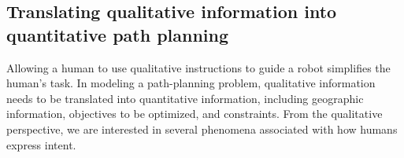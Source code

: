 \documentclass[phd]{byuprop}
\begin{document}
\subsection{Translating qualitative information into quantitative path planning}
\label{sec:intro:modeling_qualitative_information_into_quantitative_path_planning}

Allowing a human to use qualitative instructions to guide a robot simplifies the human's task.
In modeling a path-planning problem, qualitative information needs to be translated into quantitative information, including geographic information, objectives to be optimized, and constraints.
From the qualitative perspective, we are interested in several phenomena associated with how humans express intent.
\end{document}
